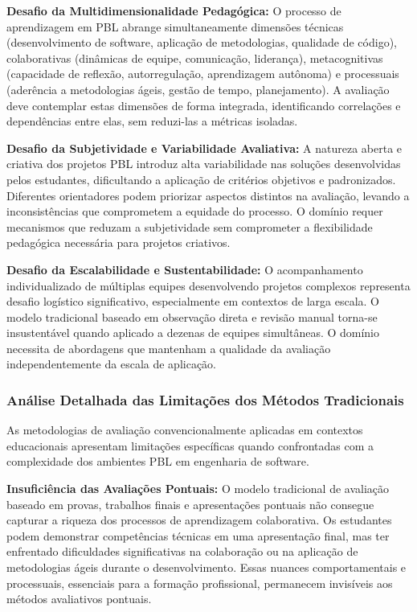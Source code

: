 \documentclass[english, spanish, brazilian]{modelo_dt}
\begin{document}
\textbf{Desafio da Multidimensionalidade Pedagógica:} O processo de aprendizagem em PBL abrange simultaneamente dimensões técnicas (desenvolvimento de software, aplicação de metodologias, qualidade de código), colaborativas (dinâmicas de equipe, comunicação, liderança), metacognitivas (capacidade de reflexão, autorregulação, aprendizagem autônoma) e processuais (aderência a metodologias ágeis, gestão de tempo, planejamento). A avaliação deve contemplar estas dimensões de forma integrada, identificando correlações e dependências entre elas, sem reduzi-las a métricas isoladas.

\textbf{Desafio da Subjetividade e Variabilidade Avaliativa:} A natureza aberta e criativa dos projetos PBL introduz alta variabilidade nas soluções desenvolvidas pelos estudantes, dificultando a aplicação de critérios objetivos e padronizados. Diferentes orientadores podem priorizar aspectos distintos na avaliação, levando a inconsistências que comprometem a equidade do processo. O domínio requer mecanismos que reduzam a subjetividade sem comprometer a flexibilidade pedagógica necessária para projetos criativos.

\textbf{Desafio da Escalabilidade e Sustentabilidade:} O acompanhamento individualizado de múltiplas equipes desenvolvendo projetos complexos representa desafio logístico significativo, especialmente em contextos de larga escala. O modelo tradicional baseado em observação direta e revisão manual torna-se insustentável quando aplicado a dezenas de equipes simultâneas. O domínio necessita de abordagens que mantenham a qualidade da avaliação independentemente da escala de aplicação.

\subsubsection{Análise Detalhada das Limitações dos Métodos Tradicionais}

As metodologias de avaliação convencionalmente aplicadas em contextos
educacionais apresentam limitações específicas quando confrontadas com a
complexidade dos ambientes PBL em engenharia de software.

\textbf{Insuficiência das Avaliações Pontuais:} O modelo tradicional de avaliação baseado em provas, trabalhos finais e apresentações pontuais não consegue capturar a riqueza dos processos de aprendizagem colaborativa. Os estudantes podem demonstrar competências técnicas em uma apresentação final, mas ter enfrentado dificuldades significativas na colaboração ou na aplicação de metodologias ágeis durante o desenvolvimento. Essas nuances comportamentais e processuais, essenciais para a formação profissional, permanecem invisíveis aos métodos avaliativos pontuais.
\end{document}

